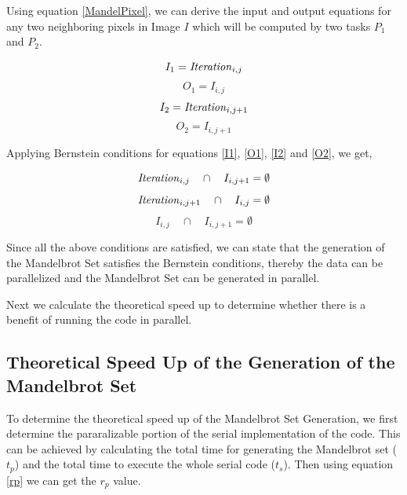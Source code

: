 \documentclass[conference]{IEEEtran}
\begin{document}
			Using equation \ref{MandelPixel}, we can derive the input and output equations for any two neighboring pixels in Image $I$ which will be computed by two tasks $P_{1}$ and $P_{2}$.
			
			\begin{equation}
			I_1 = \text{\emph{Iteration}}_{i,j} \label{I1}
			\end{equation}
			\begin{equation}
			O_1 = I_{i,j} \label{O1}
			\end{equation}
			\begin{equation}
			I_2= \text{\emph{Iteration}}_{i,j+1} \label{I2}
			\end{equation}
			\begin{equation}
			O_2= I_{i,j+1} \label{O2}
			\end{equation}
			
			Applying Bernstein conditions for equations \ref{I1}, \ref{O1}, \ref{I2} and \ref{O2}, we get,
			
			\begin{equation}
			\text{\emph{Iteration}}_{i,j}  \quad  \cap \quad I_{i,j+1} = \emptyset
			\end{equation}
			\begin{equation}
			\text{\emph{Iteration}}_{i,j+1} \quad  \cap \quad I_{i,j} = \emptyset 
			\end{equation}
			\begin{equation}
			I_{i,j}  \quad  \cap \quad  I_{i,j+1} = \emptyset 
			\end{equation}
			
			Since all the above conditions are satisfied, we can state that the generation of the Mandelbrot Set satisfies the Bernstein conditions, thereby the data can be parallelized  and the Mandelbrot Set can be generated in parallel. 
			
			Next we calculate the theoretical speed up to determine whether there is a benefit of running the code in parallel.
			
			
			\subsection{Theoretical Speed Up of the Generation of the  Mandelbrot Set}
			\label{Theo}
			To determine the theoretical speed up of the Mandelbrot Set Generation, we first determine the pararalizable portion of the serial implementation of the code. This can be achieved by calculating the total time for generating the Mandelbrot set ($t_p$) and the total time to execute the whole serial code ($t_s$). Then using equation \ref{rp} we can get the $r_p$ value.
			
\end{document}

